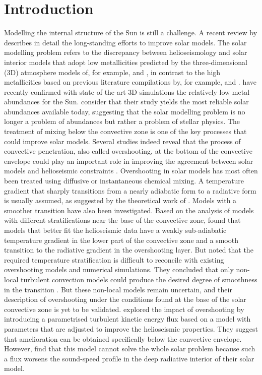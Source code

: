 \documentclass[traditabstract]{aa}
\newcommand{\3}{\ss}
\newcommand{\cp}{\citep}
\newcommand{\ct}{\citet}
\begin{document}
\section{Introduction}
\label{introduction}

Modelling the internal structure of the Sun is still a challenge. A recent review by \ct{christensen21} describes in detail the long-standing efforts to improve solar models.  The solar modelling problem refers to the discrepancy between helioseismology and solar interior models that adopt low metallicities predicted by the three-dimensional (3D) atmosphere models of, for example, \ct{asplund09} and \ct{caffau11}, in contrast to the  high metallicities based on previous literature compilations by, for example, \ct{anders89} and \ct{grevesse93}. 
 \ct{asplund21} have recently confirmed with state-of-the-art 3D simulations  the
relatively low metal abundances for the Sun.
 \ct{asplund21} consider that their study yields the most reliable solar abundances available today, suggesting that the solar modelling problem is no longer a problem of abundances but rather a problem of stellar physics. The treatment of mixing below the convective zone is one of the key processes that could improve solar models.
Several studies indeed reveal that the process of convective penetration, also called overshooting, at the bottom of the convective envelope could play an important role in improving the agreement between solar models and helioseismic constraints \cp[see for example][]{christensen11,zhang12,buldgen19a}. 
Overshooting in solar models has most often been treated using diffusive or instantaneous chemical mixing.  A temperature gradient that sharply transitions from a nearly adiabatic form to a radiative form is usually assumed, as suggested by the theoretical work of  \ct{zahn91}. Models with a smoother transition have also been investigated.
Based on the analysis of  models with different stratifications near the base of the convective zone, \ct{christensen11} found that models that better fit the helioseismic data have a weakly sub-adiabatic temperature gradient in the lower part of the convective zone and a smooth transition to the radiative gradient in the overshooting layer. But \ct{christensen11} noted that the required temperature stratification is difficult to reconcile with existing overshooting models and numerical simulations.  They concluded that only non-local turbulent convection models could produce the desired degree of smoothness in the transition \cp[see for example][]{zhangli12, zhang12}. But these non-local models remain uncertain, and their description of overshooting under the conditions found at the base of the solar convective zone is yet to be validated. \ct{zhang19} explored the impact of overshooting by introducing a parametrised turbulent kinetic energy flux based on a  model with parameters that are adjusted to improve the helioseismic properties. They suggest that amelioration can be obtained specifically below the convective envelope.  However, \ct{zhang19} find that this model cannot solve the whole solar problem because such a flux worsens the sound-speed profile in the deep radiative interior of their solar model.
\end{document}
